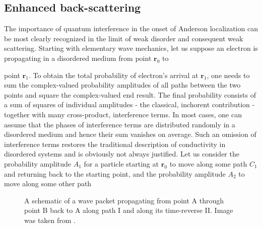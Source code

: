 \documentclass[10pt,a4paper]{article}
\begin{document}
\subsection{Enhanced back-scattering }
\label{sec:enhanced}
The importance of quantum interference in the onset of Anderson localization can be most clearly recognized in the limit of weak disorder and consequent weak scattering. Starting with elementary wave mechanics, let us suppose an electron is propagating in a disordered medium from point $\mathbf{r}_0$ to 
\begin{minipage}[t]{0.58\textwidth} 
point $\mathbf{r}_1$. To obtain the total probability of electron's arrival at $\mathbf{r}_1$, one needs to sum the complex-valued probability amplitudes of all paths between the two points and square the complex-valued end result. The final probability consists of a sum of squares of individual amplitudes - the classical, inchorent contribution - together with many cross-product, interference terms. In most cases, one can assume that the phases of interference terms are distributed randomly in a disordered medium and hence their sum vanishes on average. Such an omission of interference terms restores the traditional description of conductivity in disordered systems and is obviously not always justified. Let us consider the probability amplitude $A_1$ for a particle starting at $\mathbf{r}_0$ to move along some path $C_1$ and returning back to the starting point, and the probability amplitude $A_2$ to move along some other path
\end{minipage}\hfill
\begin{minipage}[t]{0.39\textwidth}
\begin{figure}[H]
\caption{A schematic of a wave packet propagating from point A through point B back to A along path I and along its time-reverse II. Image was taken from \cite{50yearsof}.}
\label{fig:paths} 
\end{figure}
\end{minipage}
\end{document}
